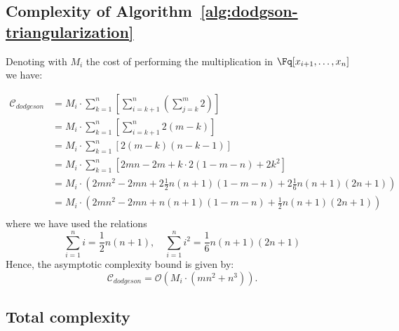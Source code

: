 \subsection{Complexity of Algorithm~\ref{alg:dodgson-triangularization}}

Denoting with $M_i$ the cost of performing the multiplication in $\Fq[x_{i+1},\dots,x_n]$ we have:

\begin{align*}
    \mathcal{C}_{dodgeson} &= M_i\cdot \sum_{k=1}^n \left[ \sum_{i=k+1}^n \left( \sum_{j=k}^m 2 \right)  \right] \\
    &= M_i\cdot \sum_{k=1}^n \left[ \sum_{i=k+1}^n 2(m-k) \right]  \\
    &= M_i\cdot \sum_{k=1}^n \left[  2(m-k)(n-k-1)  \right] \\
    &= M_i\cdot \sum_{k=1}^n \left[  2mn - 2m + k\cdot 2(1-m-n) + 2k^2  \right] \\
    &= M_i\cdot \left( 2mn^2 - 2mn + 2\frac{1}{2}n(n+1)(1-m-n) +2\frac{1}{6}n(n+1)(2n+1) \right)\\
    &= M_i\cdot \left( 2mn^2 - 2mn + n(n+1)(1-m-n) +\frac{1}{2}n(n+1)(2n+1)\right) \\
\end{align*}
where we have used the relations
\[
\sum_{i=1}^n i = \frac{1}{2}n(n+1),\quad \sum_{i=1}^n i^2 = \frac{1}{6}n(n+1)(2n+1)
\]
Hence, the asymptotic complexity bound is given by:
\begin{equation*}
    \mathcal{C}_{dodgeson} = \mathcal{O}\left( M_i\cdot (mn^2 + n^3)
    \right).
\end{equation*}
\subsection{Total complexity}
